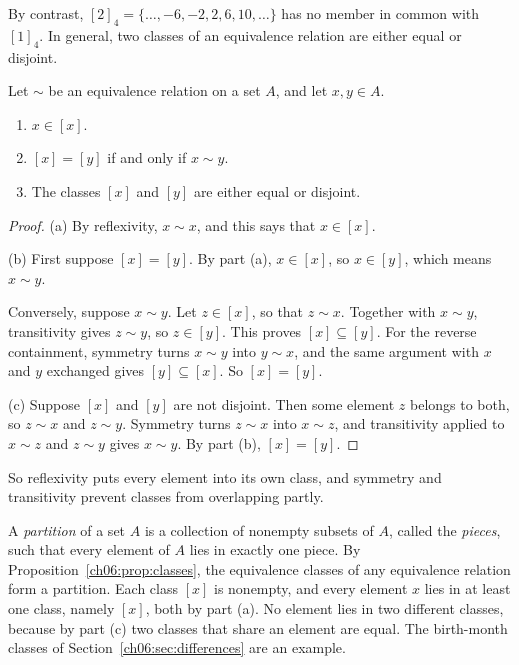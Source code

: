 By contrast, $[2]_4=\{\ldots,-6,-2,2,6,10,\ldots\}$ has no member in common with $[1]_4$. In general, two classes of an equivalence relation are either equal or disjoint.

\par\noindent\begin{minipage}{\linewidth}
\begin{proposition}\label{ch06:prop:classes}
Let $\sim$ be an equivalence relation on a set $A$, and let $x,y\in A$.
\begin{enumerate}
\item[(a)] $x\in[x]$.
\item[(b)] $[x]=[y]$ if and only if $x\sim y$.
\item[(c)] The classes $[x]$ and $[y]$ are either equal or disjoint.
\end{enumerate}
\end{proposition}
\end{minipage}\par

\begin{proof}
(a) By reflexivity, $x\sim x$, and this says that $x\in[x]$.

(b) First suppose $[x]=[y]$. By part (a), $x\in[x]$, so $x\in[y]$, which means $x\sim y$.

Conversely, suppose $x\sim y$. Let $z\in[x]$, so that $z\sim x$. Together with $x\sim y$, transitivity gives $z\sim y$, so $z\in[y]$. This proves $[x]\subseteq[y]$. For the reverse containment, symmetry turns $x\sim y$ into $y\sim x$, and the same argument with $x$ and $y$ exchanged gives $[y]\subseteq[x]$. So $[x]=[y]$.

(c) Suppose $[x]$ and $[y]$ are not disjoint. Then some element $z$ belongs to both, so $z\sim x$ and $z\sim y$. Symmetry turns $z\sim x$ into $x\sim z$, and transitivity applied to $x\sim z$ and $z\sim y$ gives $x\sim y$. By part (b), $[x]=[y]$.
\end{proof}

So reflexivity puts every element into its own class, and symmetry and transitivity prevent classes from overlapping partly.

A \emph{partition} of a set $A$ is a collection of nonempty subsets of $A$, called the \emph{pieces}, such that every element of $A$ lies in exactly one piece. By Proposition~\ref{ch06:prop:classes}, the equivalence classes of any equivalence relation form a partition. Each class $[x]$ is nonempty, and every element $x$ lies in at least one class, namely $[x]$, both by part (a). No element lies in two different classes, because by part (c) two classes that share an element are equal. The birth-month classes of Section~\ref{ch06:sec:differences} are an example.

